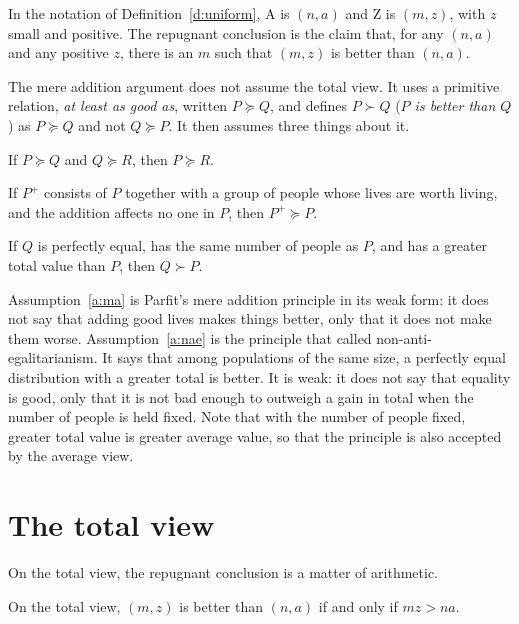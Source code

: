 \documentclass{situationist-preprint}
\begin{document}
In the notation of Definition~\ref{d:uniform}, A is $(n,a)$ and Z is $(m,z)$, with $z$ small and positive. The repugnant conclusion is the claim that, for any $(n,a)$ and any positive $z$, there is an $m$ such that $(m,z)$ is better than $(n,a)$.

The mere addition argument does not assume the total view. It uses a primitive relation, \emph{at least as good as}, written $P \succeq Q$, and defines $P \succ Q$ (\emph{$P$ is better than $Q$}) as $P \succeq Q$ and not $Q \succeq P$. It then assumes three things about it.

\begin{assumption}[Transitivity]\label{a:trans}
If $P \succeq Q$ and $Q \succeq R$, then $P \succeq R$.
\end{assumption}

\begin{assumption}\label{a:ma}
If $P^{+}$ consists of $P$ together with a group of people whose lives are worth living, and the addition affects no one in $P$, then $P^{+} \succeq P$.
\end{assumption}

\begin{assumption}\label{a:nae}
If $Q$ is perfectly equal, has the same number of people as $P$, and has a greater total value than $P$, then $Q \succ P$.
\end{assumption}

Assumption~\ref{a:ma} is Parfit's mere addition principle in its weak form: it does not say that adding good lives makes things better, only that it does not make them worse. Assumption~\ref{a:nae} is the principle that \citet{Ng1989} called non-anti-egalitarianism. It says that among populations of the same size, a perfectly equal distribution with a greater total is better. It is weak: it does not say that equality is good, only that it is not bad enough to outweigh a gain in total when the number of people is held fixed. Note that with the number of people fixed, greater total value is greater average value, so that the principle is also accepted by the average view.

\section{The total view}\label{s:total}

On the total view, the repugnant conclusion is a matter of arithmetic.

\begin{proposition}\label{p:comparison}
On the total view, $(m,z)$ is better than $(n,a)$ if and only if $m z > n a$.
\end{proposition}
\end{document}
